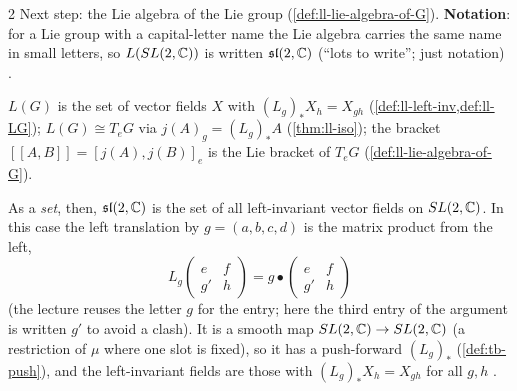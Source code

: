 \begin{paracol}{2}
Next step: the Lie algebra of the Lie group (\cref{def:ll-lie-algebra-of-G}). \textbf{Notation}: for a Lie group with a capital-letter name the Lie algebra carries the same name in small letters, so $L(SL(2,\mathbb{C}))$ is written $\mathfrak{sl}(2,\mathbb{C})$ (``lots to write''; just notation)     .
\begin{recall}
$L(G)$ is the set of vector fields $X$ with $(L_g)_*X_h=X_{gh}$ (\cref{def:ll-left-inv,def:ll-LG}); $L(G)\cong T_eG$ via $j(A)_g=(L_g)_*A$ (\cref{thm:ll-iso}); the bracket $[\![A,B]\!]=[j(A),j(B)]_e$ is the Lie bracket of $T_eG$ (\cref{def:ll-lie-algebra-of-G}).
\end{recall}
As a \emph{set}, then, $\mathfrak{sl}(2,\mathbb{C})$ is the set of all left-invariant vector fields on $SL(2,\mathbb{C})$. In this case the left translation by $g=(a,b,c,d)$ is the matrix product from the left,
\[
  L_g\begin{pmatrix}e&f\\g'&h\end{pmatrix}=g\bullet\begin{pmatrix}e&f\\g'&h\end{pmatrix}
\]
(the lecture reuses the letter $g$ for the entry; here the third entry of the argument is written $g'$ to avoid a clash). It is a smooth map $SL(2,\mathbb{C})\to SL(2,\mathbb{C})$ (a restriction of $\mu$ where one slot is fixed), so it has a push-forward $(L_g)_*$ (\cref{def:tb-push}), and the left-invariant fields are those with $(L_g)_*X_h=X_{gh}$ for all $g,h$         .


\end{paracol}
